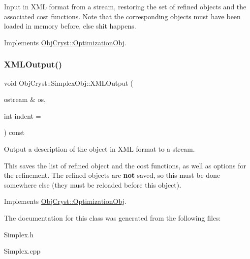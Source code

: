 Input in X\+ML format from a stream, restoring the set of refined objects and the associated cost functions. Note that the corresponding objects must have been loaded in memory before, else shit happens. 



Implements \mbox{\hyperlink{class_obj_cryst_1_1_optimization_obj_aa07aee60f56780e2c56fb20f4a5f48a8}{Obj\+Cryst\+::\+Optimization\+Obj}}.

\mbox{\label{class_obj_cryst_1_1_simplex_obj_a6437ce6f4077afb198e26069c4cb224e}} 
\subsubsection{\texorpdfstring{XMLOutput()}{XMLOutput()}}
{\footnotesize\ttfamily void Obj\+Cryst\+::\+Simplex\+Obj\+::\+X\+M\+L\+Output (\begin{DoxyParamCaption}\item[{ostream \&}]{os,  }\item[{int}]{indent = {} }\end{DoxyParamCaption}) const\hspace{0.3cm}{\ttfamily [virtual]}}



Output a description of the object in X\+ML format to a stream. 

This saves the list of refined object and the cost functions, as well as options for the refinement. The refined objects are {\bfseries{not}} saved, so this must be done somewhere else (they must be reloaded before this object). 

Implements \mbox{\hyperlink{class_obj_cryst_1_1_optimization_obj_a6b7726159bb0d5dad1c7eebaee78f53a}{Obj\+Cryst\+::\+Optimization\+Obj}}.



The documentation for this class was generated from the following files\+:\begin{DoxyCompactItemize}
\item 
Simplex.\+h\item 
Simplex.\+cpp\end{DoxyCompactItemize}
